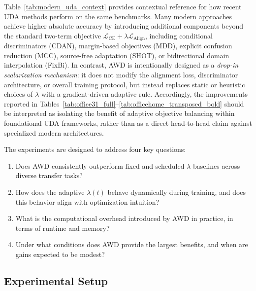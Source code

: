 \documentclass[pdflatex,sn-mathphys-num]{sn-jnl}
\theoremstyle{thmstyleone}
\theoremstyle{thmstyletwo}
\theoremstyle{thmstylethree}
\begin{document}
Table~\ref{tab:modern_uda_context} provides contextual reference for how 
recent UDA methods perform on the same benchmarks.
Many modern approaches achieve higher absolute accuracy by introducing 
additional components beyond the standard two-term objective
$\mathcal{L}_{\text{CE}} + \lambda \mathcal{L}_{\text{Align}}$,
including conditional discriminators (CDAN), margin-based objectives (MDD),
explicit confusion reduction (MCC), source-free adaptation (SHOT),
or bidirectional domain interpolation (FixBi).
In contrast, AWD is intentionally designed as a \emph{drop-in scalarization mechanism}:
it does not modify the alignment loss, discriminator architecture,
or overall training protocol, but instead replaces static or heuristic choices of
$\lambda$ with a gradient-driven adaptive rule.
Accordingly, the improvements reported in
Tables~\ref{tab:office31_full}--\ref{tab:officehome_transposed_bold}
should be interpreted as isolating the benefit of adaptive objective balancing
within foundational UDA frameworks, rather than as a direct head-to-head
claim against specialized modern architectures.

The experiments are designed to address four key questions:
\begin{enumerate}
    \item Does AWD consistently outperform fixed and scheduled $\lambda$ baselines across diverse transfer tasks?
    \item How does the adaptive $\lambda(t)$ behave dynamically during training, and does this behavior align with optimization intuition?
    \item What is the computational overhead introduced by AWD in practice, in terms of runtime and memory?
    \item Under what conditions does AWD provide the largest benefits, and when are gains expected to be modest?
\end{enumerate}

\subsection{Experimental Setup}
\end{document}
